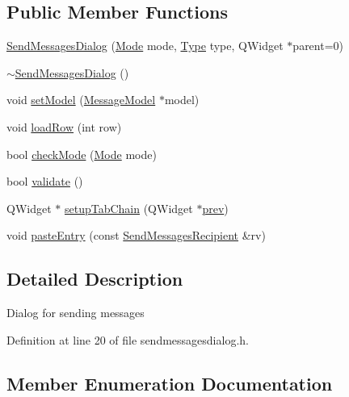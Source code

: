 \subsection*{Public Member Functions}
\begin{DoxyCompactItemize}
\item 
\hyperlink{class_send_messages_dialog_a81ada34f0c63a07146b71d85a5512982}{Send\+Messages\+Dialog} (\hyperlink{class_send_messages_dialog_aa123d2b61a8bd27c054469a331d69c43}{Mode} mode, \hyperlink{class_send_messages_dialog_ae5855bcf6efac64a72d85546f1cabc35}{Type} type, Q\+Widget $\ast$parent=0)
\item 
\hyperlink{class_send_messages_dialog_a59c98762d1250c6c1a98490fd33ba2d8}{$\sim$\+Send\+Messages\+Dialog} ()
\item 
void \hyperlink{class_send_messages_dialog_ab25d3875c24cac123811ac5d79804bc2}{set\+Model} (\hyperlink{class_message_model}{Message\+Model} $\ast$model)
\item 
void \hyperlink{class_send_messages_dialog_a8c3c08ba52d32a7f76eedc7596704adf}{load\+Row} (int row)
\item 
bool \hyperlink{class_send_messages_dialog_afa1bc0a7c0fb4cb9859cc5fd9cd0fb31}{check\+Mode} (\hyperlink{class_send_messages_dialog_aa123d2b61a8bd27c054469a331d69c43}{Mode} mode)
\item 
bool \hyperlink{class_send_messages_dialog_aab11689b1f6424487e2c36bae2e4a618}{validate} ()
\item 
Q\+Widget $\ast$ \hyperlink{class_send_messages_dialog_aa0c54ef61cb934fd4f687981bc449e30}{setup\+Tab\+Chain} (Q\+Widget $\ast$\hyperlink{cache_8cc_aabbd2f01bb8ec4a7a0128bce5f8cdb1b}{prev})
\item 
void \hyperlink{class_send_messages_dialog_a8282ce8ff57624617dd53366f23e2c17}{paste\+Entry} (const \hyperlink{class_send_messages_recipient}{Send\+Messages\+Recipient} \&rv)
\end{DoxyCompactItemize}


\subsection{Detailed Description}
Dialog for sending messages 

Definition at line 20 of file sendmessagesdialog.\+h.



\subsection{Member Enumeration Documentation}
\hypertarget{class_send_messages_dialog_aa123d2b61a8bd27c054469a331d69c43}{}
